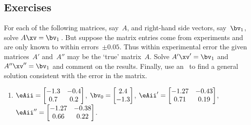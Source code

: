 





\subsection{Exercises}



\begin{exercise} \label{ex:errmats} 
For each of the following matrices, say~\(A\), and right-hand side vectors, say~\(\bv_1\),
solve \(A\xv=\bv_1\)\,.
But suppose the matrix entries come from experiments and are only known to within errors~\(\pm0.05\).
Thus within experimental error the given matrices~\(A'\) and~\(A''\) may be the `true' matrix~\(A\).
Solve \(A'\xv'=\bv_1\) and \(A''\xv''=\bv_1\) and comment on the results.
Finally, use an \svd\ to find a general solution consistent with the error in the matrix.

\begin{enumerate} \raggedright
\item \(\eAii=\begin{bmatrix} -1.3&-0.4\\0.7&0.2 \end{bmatrix}\),
\(\bv_{\arabic{enumii}}=\begin{bmatrix} 2.4\\-1.3 \end{bmatrix}\), 
\(\eAii'=\begin{bmatrix} -1.27&-0.43\\0.71&0.19 \end{bmatrix}\),
\(\eAii''=\begin{bmatrix} -1.27&-0.38\\0.66&0.22 \end{bmatrix}\).


\end{enumerate}
\end{exercise}
